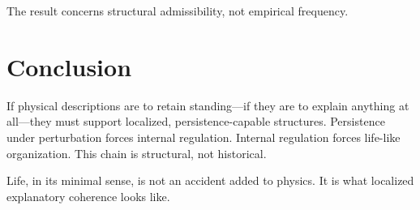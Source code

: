 \documentclass[11pt]{article}
\begin{document}
The result concerns structural admissibility, not empirical frequency.

\section{Conclusion}

If physical descriptions are to retain standing---if they are to explain anything at all---they must support localized, persistence-capable structures. Persistence under perturbation forces internal regulation. Internal regulation forces life-like organization. This chain is structural, not historical.

Life, in its minimal sense, is not an accident added to physics. It is what localized explanatory coherence looks like.
\end{document}
